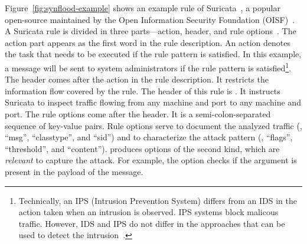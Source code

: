 \documentclass[sigconf,review, anonymous]{acmart}
\begin{document}
Figure~\ref{fig:synflood-example} shows an example rule of
Suricata~\cite{suricata}, a popular open-source \nids{} maintained by
the Open Information Security Foundation (OISF)~\cite{oisf}.
A Suricata rule is divided in three parts---action, header, and rule
options~\cite{suri-rule-format}. The action part appears as the first
word in the rule description. An action denotes the task that needs to
be executed if the rule pattern is satisfied.  In this example, a
message will be sent to system administrators if the rule pattern is
satisfied\footnote{Technically, an IPS (Intrusion Prevention System)
  differs from an IDS in the action taken when an intrusion is
  observed. IPS systems block malicous traffic. However, IDS and IPS
  do not differ in the approaches that can be used to detect the
  intrusion~\cite{ids-ips}.}. The header comes after the action in the rule
description. It restricts the information flow covered by the
rule. The header of this rule is . It instructs Suricata to inspect  traffic flowing
from any machine and port to any machine and port. The rule options come after the header. It is a
semi-colon-separated sequence of key-value pairs. Rule options serve
to document the analyzed traffic (\eg{}, ``msg'', ``classtype'', and
``sid'') and to characterize the attack pattern (\eg, ``flags'',
``threshold'', and ``content''). \tname{} produces options of the
second kind, which are \emph{relevant} to capture the attack. For
example, the option  checks if the argument is
present in the payload of the message.
\end{document}
